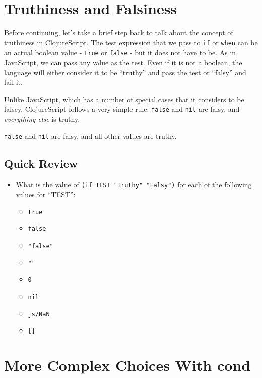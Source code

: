 \documentclass[10pt,twoside,openright]{memoir}
\begin{document}
\section{Truthiness and Falsiness}

Before continuing, let's take a brief step back to talk about the
concept of truthiness in ClojureScript. The test expression that we pass
to \texttt{if} or \texttt{when} can be an actual boolean value -
\texttt{true} or \texttt{false} - but it does not have to be. As in
JavaScript, we can pass any value as the test. Even if it is not a
boolean, the language will either consider it to be ``truthy'' and pass
the test or ``falsy'' and fail it.

Unlike JavaScript, which has a number of special cases that it considers
to be falsey, ClojureScript follows a very simple rule: \texttt{false}
and \texttt{nil} are falsy, and \emph{everything else} is truthy.

\begin{notice}[title={ClojureScript's Truthiness Rule}]
\texttt{false} and \texttt{nil} are falsy, and all other values are truthy.
\end{notice}

\subsection{Quick Review}

\begin{itemize}
\tightlist
\item
  What is the value of \texttt{(if\ TEST\ "Truthy"\ "Falsy")} for each
  of the following values for ``TEST'':

  \begin{itemize}
  \tightlist
  \item
    \texttt{true}
  \item
    \texttt{false}
  \item
    \texttt{"false"}
  \item
    \texttt{""}
  \item
    \texttt{0}
  \item
    \texttt{nil}
  \item
    \texttt{js/NaN}
  \item
    \texttt{{[}{]}}
  \end{itemize}
\end{itemize}

\section{More Complex Choices With cond}
\end{document}
